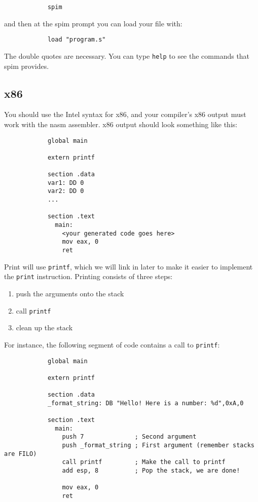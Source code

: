 \documentclass{article}
\newcommand{\code}[1]{\texttt{\textmd{#1}}}
\begin{document}
		\begin{lstlisting}
			spim
		\end{lstlisting}

		and then at the spim prompt you can load your file with:

		\begin{lstlisting}
			load "program.s"
		\end{lstlisting}

		The double quotes are necessary. You can type \texttt{help} to see the commands that spim provides.


	\subsection{x86}

		You should use the Intel syntax for x86, and your compiler's x86 output must work with the nasm assembler.
		x86 output should look something like this:

		\begin{lstlisting}
			global main

			extern printf

			section .data
			var1: DD 0
			var2: DD 0
			...

			section .text
			  main:
			    <your generated code goes here>
			    mov eax, 0
			    ret
		\end{lstlisting}

		Print will use \code{printf}, which we will link in later to make it easier to implement the \code{print}
		instruction. Printing consists of three steps:

		\begin{enumerate}
			\item push the arguments onto the stack
			\item call \code{printf}
			\item clean up the stack
		\end{enumerate}

		For instance, the following segment of code contains a call to \code{printf}:

		\begin{lstlisting}
			global main

			extern printf

			section .data
			_format_string: DB "Hello! Here is a number: %d",0xA,0

			section .text
			  main:
			    push 7              ; Second argument
			    push _format_string ; First argument (remember stacks are FILO)
			    call printf         ; Make the call to printf
			    add esp, 8          ; Pop the stack, we are done!

			    mov eax, 0
			    ret
		\end{lstlisting}
\end{document}
